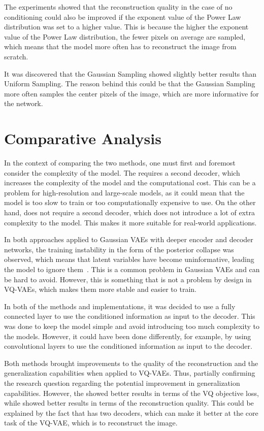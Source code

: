 The experiments showed that the reconstruction quality in the case of no conditioning could also be improved if the exponent value of the Power Law distribution was set to a higher value. This is because the higher the exponent value of the Power Law distribution, the fewer pixels on average are sampled, which means that the model more often has to reconstruct the image from scratch.

It was discovered that the Gaussian Sampling showed slightly better results than Uniform Sampling. The reason behind this could be that the Gaussian Sampling more often samples the center pixels of the image, which are more informative for the network.

\section{Comparative Analysis}

In the context of comparing the two methods, one must first and foremost consider the complexity of the model. The  requires a second decoder,
which increases the complexity of the model and the computational cost. This can be a problem for high-resolution and large-scale models, as it could mean that the model is too slow to train or too computationally expensive to use. On the other hand,  does not require a second decoder, which does not introduce a lot of extra complexity to the model. This makes it more suitable for real-world applications.

In both approaches applied to Gaussian VAEs with deeper encoder and decoder networks, the training instability in the form of the posterior collapse was observed, which means that latent variables have become uninformative, leading the model to ignore them~\cite{lucas2019dont}. This is a common problem in Gaussian VAEs and can be hard to avoid. However, this is something that is not a problem by design in VQ-VAEs, which makes them more stable and easier to train.

In both of the methods and implementations, it was decided to use a fully connected layer to use the conditioned information as input to the decoder. This was done to keep the model simple and avoid introducing too much complexity to the models. However, it could have been done differently, for example, by using convolutional layers to use the conditioned information as input to the decoder.

Both methods brought improvements to the quality of the reconstruction and the generalization capabilities when applied to VQ-VAEs. Thus, partially confirming the research question regarding the potential improvement in generalization capabilities. However, the  showed better results in terms of the VQ objective loss, while  showed better results in terms of the reconstruction quality. This could be explained by the fact that  has two decoders, which can make it better at the core task of the VQ-VAE, which is to reconstruct the image.

